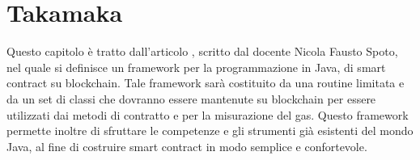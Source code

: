 
\chapter{Takamaka}
\label{takamaka-chapter}
Questo capitolo è tratto dall'articolo \cite{paper-takamaka:spoto}, scritto dal docente Nicola Fausto Spoto, nel quale si definisce un framework per la programmazione in Java, di smart contract su blockchain. Tale framework sarà costituito da una routine limitata e da un set di classi che dovranno essere mantenute su blockchain per essere utilizzati dai metodi di contratto e per la misurazione del gas. Questo framework permette inoltre di sfruttare le competenze e gli strumenti già esistenti del mondo Java, al fine di  costruire smart contract in modo semplice e confortevole. 

